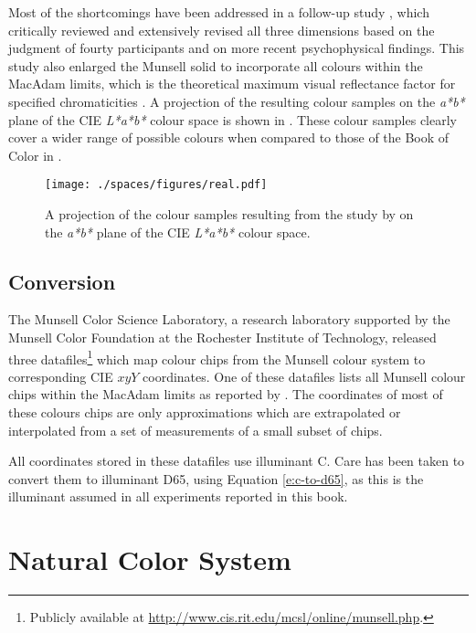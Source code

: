 Most of the shortcomings have been addressed in a follow-up study
\citep{newhall42final}, which critically reviewed and extensively
revised all three dimensions based on the judgment of fourty
participants and on more recent psychophysical findings. This study
also enlarged the Munsell solid to incorporate all colours within the
MacAdam limits, which is the theoretical maximum visual reflectance
factor for specified chromaticities \citep{macadam35maximum}. A
projection of the resulting colour samples on the \emph{a*b*} plane of
the CIE \emph{L*a*b*} colour space is shown in . These colour samples clearly cover a wider range of \enlargethispage{\baselineskip}
possible colours when compared to those of the Book of Color in .

\begin{figure}[htbp]
\begin{center}
\texttt{[image: ./spaces/figures/real.pdf]}
\caption[Colour samples resulting from a study by
\citeauthor{newhall42final}]{A projection of the colour samples
  resulting from the study by \citeauthor{newhall42final} on the
  \emph{a*b*} plane of the CIE \emph{L*a*b*} colour space.}
\label{f:munsell}
\end{center}
\end{figure}

\subsection{Conversion}

The Munsell Color Science Laboratory, a research laboratory supported
by the Munsell Color Foundation at the Rochester Institute of
Technology, released three datafiles\footnote{Publicly available at
  \url{http://www.cis.rit.edu/mcsl/online/munsell.php}.} which map
colour chips from the Munsell colour system to corresponding CIE $xyY$
coordinates. One of these datafiles lists all Munsell colour chips
within the MacAdam limits as reported by \citet{newhall42final}. The
coordinates of most of these colours chips are only approximations
which are extrapolated or interpolated from a set of measurements of a
small subset of chips.

All coordinates stored in these datafiles use illuminant C. Care has
been taken to convert them to illuminant D65, using Equation
\ref{e:c-to-d65}, as this is the illuminant assumed in all experiments
reported in this book.

\section{Natural Color System}
\label{s:NCS}


